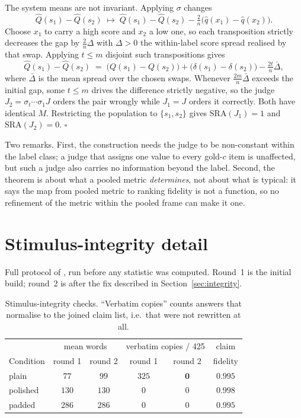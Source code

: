 \documentclass{article}
\theoremstyle{plain}
\theoremstyle{definition}
\newcommand{\qhat}{\hat{q}}
\newcommand{\Qhat}{\hat{Q}}
\newcommand{\SRA}{\mathrm{SRA}}
\begin{document}
The system means are not invariant. Applying $\sigma$ changes
\[
\Qhat(s_1)-\Qhat(s_2) \;\longmapsto\; \Qhat(s_1)-\Qhat(s_2) - \tfrac{2}{n}\bigl(\qhat(x_1)-\qhat(x_2)\bigr).
\]
Choose $x_1$ to carry a high score and $x_2$ a low one, so each transposition strictly
decreases the gap by $\tfrac{2}{n}\Delta$ with $\Delta>0$ the within-label score spread
realised by that swap. Applying $t \le m$ disjoint such transpositions gives
\[
\Qhat(s_1)-\Qhat(s_2) \;=\; \bigl(Q(s_1)-Q(s_2)\bigr) + \bigl(\delta(s_1)-\delta(s_2)\bigr) - \tfrac{2t}{n}\bar\Delta ,
\]
where $\bar\Delta$ is the mean spread over the chosen swaps. Whenever
$\tfrac{2m}{n}\bar\Delta$ exceeds the initial gap, some $t\le m$ drives the difference
strictly negative, so the judge $J_2 = \sigma_t\cdots\sigma_1 J$ orders the pair wrongly while
$J_1=J$ orders it correctly. Both have identical $M$. Restricting the population to
$\{s_1,s_2\}$ gives $\SRA(J_1)=1$ and $\SRA(J_2)=0$. $\square$

Two remarks. First, the construction needs the judge to be non-constant within the label
class; a judge that assigns one value to every gold-$c$ item is unaffected, but such a judge
also carries no information beyond the label. Second, the theorem is about what a pooled
metric \emph{determines}, not about what is typical: it says the map from pooled metric to
ranking fidelity is not a function, so no refinement of the metric within the pooled frame
can make it one.

\section{Stimulus-integrity detail}
\label{app:integrity}

Full protocol of \citet{balli2026oracle}, run before any statistic was computed. Round~1 is
the initial build; round~2 is after the fix described in Section~\ref{sec:integrity}.

\begin{table}[h]
\caption{Stimulus-integrity checks. ``Verbatim copies'' counts answers that normalise to the
joined claim list, i.e.\ that were not rewritten at all.}
\centering\small
\begin{tabular}{lccccc}
\toprule
& \multicolumn{2}{c}{mean words} & \multicolumn{2}{c}{verbatim copies / 425} & claim \\
Condition & round 1 & round 2 & round 1 & round 2 & fidelity \\
\midrule
plain    & $77$  & $99$  & $325$ & $\mathbf{0}$ & $0.995$ \\
polished & $130$ & $130$ & $0$   & $0$          & $0.998$ \\
padded   & $286$ & $286$ & $0$   & $0$          & $0.995$ \\
\bottomrule
\end{tabular}
\end{table}
\end{document}
